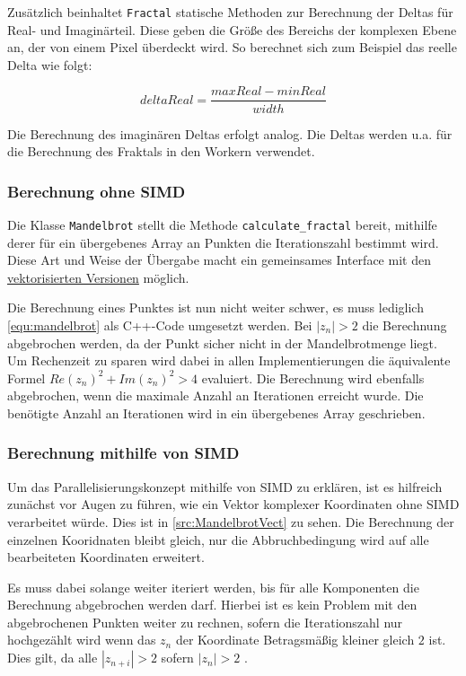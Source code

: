 Zusätzlich beinhaltet \verb|Fractal| statische Methoden zur Berechnung der Deltas für Real- und Imaginärteil.
Diese geben die Größe des Bereichs der komplexen Ebene an, der von einem Pixel überdeckt wird.
So berechnet sich zum Beispiel das reelle Delta wie folgt:

\begin{equation*}
	deltaReal = \frac{maxReal - minReal}{width}
\end{equation*}

Die Berechnung des imaginären Deltas erfolgt analog.
Die Deltas werden u.a. für die Berechnung des Fraktals in den Workern verwendet.

\subsubsection{Berechnung ohne SIMD}

Die Klasse \verb|Mandelbrot| stellt die Methode \verb|calculate_fractal| bereit,
mithilfe derer für ein übergebenes Array an Punkten die Iterationszahl bestimmt wird.
Diese Art und Weise der Übergabe macht ein gemeinsames Interface mit den \hyperref[subsec:simd]{vektorisierten Versionen} möglich.

Die Berechnung eines Punktes ist nun nicht weiter schwer, es muss lediglich \autoref{equ:mandelbrot} als C++-Code umgesetzt werden.
Bei $|z_n| > 2$ die Berechnung abgebrochen werden, da der Punkt sicher nicht in der Mandelbrotmenge liegt.
Um Rechenzeit zu sparen wird dabei in allen Implementierungen die äquivalente Formel $Re(z_n)^2 + Im(z_n)^2 > 4$ evaluiert.
Die Berechnung wird ebenfalls abgebrochen, wenn die maximale Anzahl an Iterationen erreicht wurde.
Die benötigte Anzahl an Iterationen wird in ein übergebenes Array geschrieben.

\subsubsection{Berechnung mithilfe von SIMD}\label{subsec:simd}

Um das Parallelisierungskonzept mithilfe von SIMD zu erklären,
ist es hilfreich zunächst vor Augen zu führen, wie ein Vektor komplexer Koordinaten ohne SIMD verarbeitet würde.
Dies ist in \autoref{src:MandelbrotVect} zu sehen.
Die Berechnung der einzelnen Kooridnaten bleibt gleich, nur die Abbruchbedingung wird auf alle bearbeiteten Koordinaten erweitert.

Es muss dabei solange weiter iteriert werden, bis für alle Komponenten die Berechnung abgebrochen werden darf.
Hierbei ist es kein Problem mit den abgebrochenen Punkten weiter zu rechnen, sofern die
Iterationszahl nur hochgezählt wird wenn das $z_n$ der Koordinate Betragsmäßig kleiner gleich $2$ ist.
Dies gilt, da alle $|z_{n+i}| > 2$ sofern $|z_n| > 2$ \cite{424331}.

